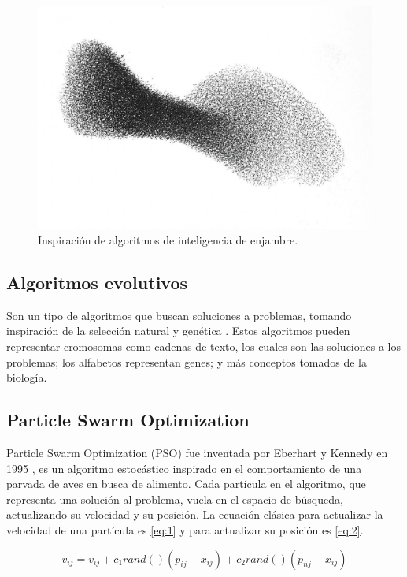 \documentclass[letterpaper]{report}
\begin{document}
    \begin{figure}[ht!]
      \includegraphics[scale=0.18]{si-repr}
      \centering
      \caption{Inspiración de algoritmos de inteligencia de enjambre.}
      \centering
    \end{figure}

  \subsection{Algoritmos evolutivos}
    Son un tipo de algoritmos que buscan soluciones a problemas, tomando
    inspiración de la selección natural y genética \cite{EADef,GADef}. Estos 
    algoritmos pueden representar cromosomas como cadenas de texto, los cuales 
    son las soluciones a los problemas; los alfabetos representan genes; y más
    conceptos tomados de la biología.

  \subsection{Particle Swarm Optimization}
    Particle Swarm Optimization (PSO) fue inventada por Eberhart y Kennedy en
    1995 \cite{PSODef}, es un algoritmo
    estocástico inspirado en el comportamiento de una parvada de aves en busca
    de alimento. Cada partícula en el algoritmo, que representa una solución al
    problema, vuela en el espacio de búsqueda, actualizando su velocidad y su
    posición. La ecuación clásica para actualizar la velocidad de una partícula
    es \ref{eq:1} y para actualizar su posición es \ref{eq:2}.

    \begin{equation}
      \label{eq:1}
      v_{ij} = v_{ij} + c_1 rand()(p_{ij} - x_{ij}) + c_2 rand()(p_{nj} - x_{ij})
    \end{equation}
\end{document}

